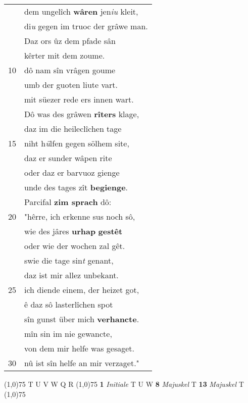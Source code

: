 \documentclass[8pt,a4paper,notitlepage]{article}
\begin{document}
\begin{table}[ht]
\begin{minipage}[t]{0.5\linewidth}
\begin{tabular}{rl}
 & dem ungelîch \textbf{wâren} jen\textit{iu} kleit,\\ 
 & di\textit{u} gegen im truoc der grâwe man.\\ 
 & Daz ors ûz dem pfade sân\\ 
 & kêrter mit dem zoume.\\ 
10 & dô nam sîn vrâgen goume\\ 
 & umb der guoten liute vart.\\ 
 & mit süezer rede ers innen wart.\\ 
 & Dô was des grâwen \textbf{rîters} klage,\\ 
 & daz im die heileclîchen tage\\ 
15 & niht h\textit{ü}lfen gegen sölhem site,\\ 
 & daz er sunder wâpen rite\\ 
 & oder daz er barvuoz gienge\\ 
 & unde des tages zît \textbf{begienge}.\\ 
 & Parcifal \textbf{zim sprach} dô:\\ 
20 & "hêrre, ich erkenne sus noch sô,\\ 
 & wie des jâres \textbf{urhap} \textbf{gestêt}\\ 
 & oder wie der wochen zal gêt.\\ 
 & swie die tage sin\textit{t} genant,\\ 
 & daz ist mir allez unbekant.\\ 
25 & ich diende einem, der heizet got,\\ 
 & ê daz sô lasterlîchen spot\\ 
 & sîn gunst über mich \textbf{verhancte}.\\ 
 & mîn sin im nie gewancte,\\ 
 & von dem mir helfe was gesaget.\\ 
30 & nû ist sîn helfe an mir verzaget."\\ 
\end{tabular}
\scriptsize
\line(1,0){75} \newline
T U V W Q R \newline
\line(1,0){75} \newline
\textbf{1} \textit{Initiale} T U W  \textbf{8} \textit{Majuskel} T  \textbf{13} \textit{Majuskel} T  \newline
\line(1,0){75} \newline

\end{minipage}
\end{table}
\end{document}
